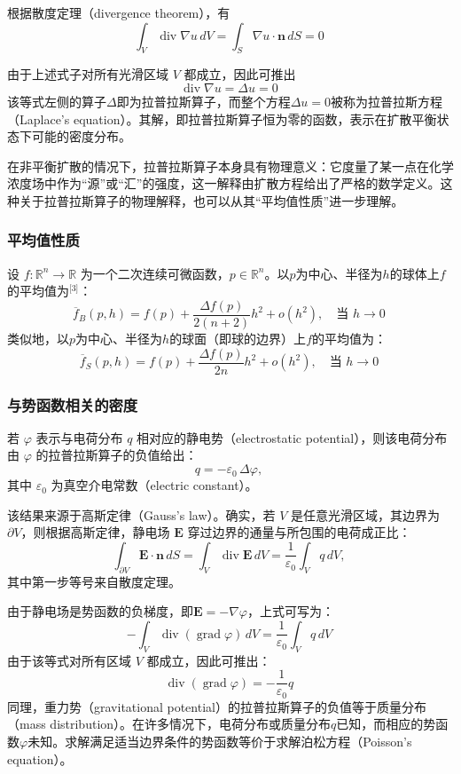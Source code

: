 根据散度定理（divergence theorem），有
\[
\int_{V} \operatorname{div} \nabla u \, dV
= \int_{S} \nabla u \cdot \mathbf{n} \, dS = 0~
\]

由于上述式子对所有光滑区域 $V$ 都成立，因此可推出
\[
\operatorname{div} \nabla u = \Delta u = 0~
\]
该等式左侧的算子$\Delta$即为拉普拉斯算子，而整个方程$\Delta u = 0$被称为拉普拉斯方程（Laplace’s equation）。其解，即拉普拉斯算子恒为零的函数，表示在扩散平衡状态下可能的密度分布。

在非平衡扩散的情况下，拉普拉斯算子本身具有物理意义：它度量了某一点在化学浓度场中作为“源”或“汇”的强度，这一解释由扩散方程给出了严格的数学定义。这种关于拉普拉斯算子的物理解释，也可以从其“平均值性质”进一步理解。
\subsubsection{平均值性质}
设 $f : \mathbb{R}^{n} \to \mathbb{R}$ 为一个二次连续可微函数，$p \in \mathbb{R}^{n}$。以$p$为中心、半径为$h$的球体上$f$的平均值为\(^\text{[3]}\)：
\[
\overline{f}_{B}(p, h)
= f(p) + \frac{\Delta f(p)}{2(n + 2)}h^{2} + o(h^{2}),
\quad \text{当 } h \to 0~
\]
类似地，以$p$为中心、半径为$h$的球面（即球的边界）上$f$的平均值为：
\[
\overline{f}_{S}(p, h)
= f(p) + \frac{\Delta f(p)}{2n}h^{2} + o(h^{2}),
\quad \text{当 } h \to 0~
\]
\subsubsection{与势函数相关的密度}
若 $\varphi$ 表示与电荷分布 $q$ 相对应的静电势（electrostatic potential），则该电荷分布由 $\varphi$ 的拉普拉斯算子的负值给出：
\[
q = -\varepsilon_{0}\,\Delta \varphi,~
\]
其中 $\varepsilon_{0}$ 为真空介电常数（electric constant）。

该结果来源于高斯定律（Gauss’s law）。确实，若 $V$ 是任意光滑区域，其边界为 $\partial V$，则根据高斯定律，静电场 $\mathbf{E}$ 穿过边界的通量与所包围的电荷成正比：
\[
\int_{\partial V} \mathbf{E} \cdot \mathbf{n}\, dS
= \int_{V} \operatorname{div} \mathbf{E}\, dV
= \frac{1}{\varepsilon_{0}} \int_{V} q\, dV,~
\]
其中第一步等号来自散度定理。

由于静电场是势函数的负梯度，即$\mathbf{E} = -\nabla \varphi$，上式可写为：
\[
-\int_{V} \operatorname{div}(\operatorname{grad} \varphi)\, dV
= \frac{1}{\varepsilon_{0}} \int_{V} q\, dV~
\]
由于该等式对所有区域 $V$ 都成立，因此可推出：
\[
\operatorname{div}(\operatorname{grad} \varphi)
= -\frac{1}{\varepsilon_{0}} q~
\]
同理，重力势（gravitational potential）的拉普拉斯算子的负值等于质量分布（mass distribution）。在许多情况下，电荷分布或质量分布$q$已知，而相应的势函数$\varphi$未知。求解满足适当边界条件的势函数等价于求解泊松方程（Poisson’s equation）。

